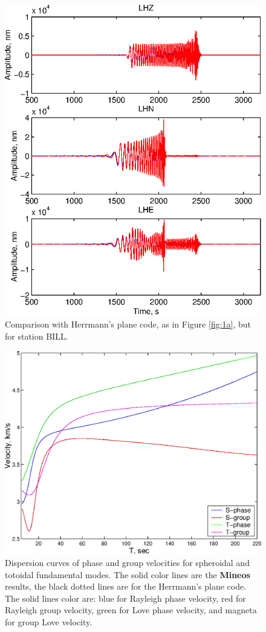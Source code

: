 \begin{figure}
\begin{center}
\includegraphics[width=5 in]{Figures/Fig3a}
\caption{Comparison with Herrmann's plane code, as in Figure \ref{fig:1a}, but for 
station BILL.} 
\label{fig:3a}
\end{center}
\end{figure}
\begin{figure}
\begin{center}
\includegraphics[width=5 in]{Figures/Fig4a}
\caption{Dispersion curves of phase and group velocities for spheroidal and totoidal
fundamental modes. The solid color lines are the {\bf Mineos} results, the 
black dotted lines are for the Herrmann's plane code. The solid lines 
color are: blue for Rayleigh phase velocity, red for Rayleigh group 
velocity, green for Love phase velocity, and magneta for group Love velocity. }
\label{fig:4a}
\end{center}
\end{figure}
%
\newpage
